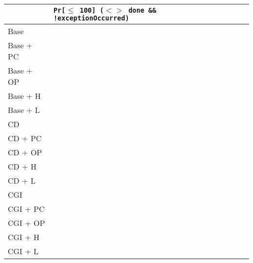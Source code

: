 \begin{table}
    \begin{tabular}{l|l|l}
    ~         & \texttt{Pr[$\leq$ 100] ($<>$ done \&\& !exceptionOccurred)} & ~ \\ \hline
    Base      & ~                                                                                    & ~ \\
    Base + PC & ~                                                                                    & ~ \\
    Base + OP & ~                                                                                    & ~ \\
    Base + H  & ~                                                                                    & ~ \\
    Base + L  & ~                                                                                    & ~ \\
    CD        & ~                                                                                    & ~ \\
    CD + PC   & ~                                                                                    & ~ \\
    CD + OP   & ~                                                                                    & ~ \\
    CD + H    & ~                                                                                    & ~ \\
    CD + L    & ~                                                                                    & ~ \\
    CGI       & ~                                                                                    & ~ \\
    CGI + PC  & ~                                                                                    & ~ \\
    CGI + OP  & ~                                                                                    & ~ \\
    CGI + H   & ~                                                                                    & ~ \\
    CGI + L   & ~                                                                                    & ~ \\
    \end{tabular}
\end{table}